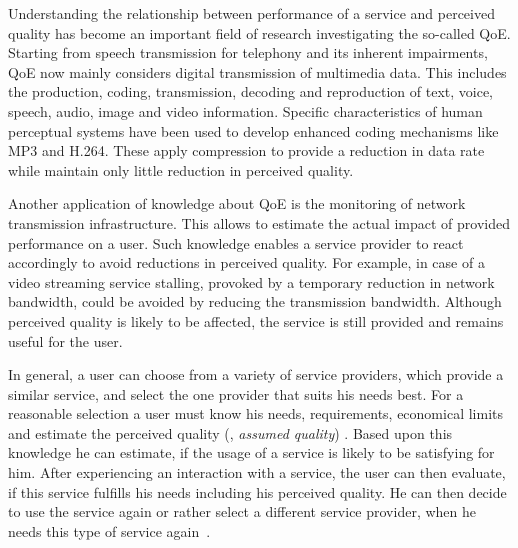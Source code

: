 Understanding the relationship between performance of a service and perceived quality has become an important field of research investigating the so-called \ac{QoE}.
Starting from speech transmission for telephony \citep[][]{ieee_audio_and_electroacoustics_group_ieee_1969} and its inherent impairments, \ac{QoE} now mainly considers digital transmission of multimedia data. %
This includes the production, coding, transmission, decoding and reproduction of text, voice, speech, audio, image and video information.
Specific characteristics of human perceptual systems have been used to develop enhanced coding mechanisms like \ac{MP3} and H.264.
These apply compression to provide a reduction in data rate while maintain only little reduction in perceived quality.

Another application of knowledge about \ac{QoE} is the monitoring of network transmission infrastructure.
This allows to estimate the actual impact of provided performance on a user.
Such knowledge enables a service provider to react accordingly to avoid reductions in perceived quality.
For example, in case of a video streaming service stalling, provoked by a temporary reduction in network bandwidth, could be avoided by reducing the transmission bandwidth.
Although perceived quality is likely to be affected, the service is still provided and remains useful for the user.

In general, a user can choose from a variety of service providers, which provide a similar service, and select the one provider that suits his needs best.
For a reasonable selection a user must know his needs, requirements, economical limits and estimate the perceived quality (\ie, \emph{assumed quality}) \citep[][p.~13]{raake_quality_2014}.
Based upon this knowledge he can estimate, if the usage of a service is likely to be satisfying for him.
After experiencing an interaction with a service, the user can then evaluate, if this service fulfills his needs including his perceived quality.
He can then decide to use the service again or rather select a different service provider, when he needs this type of service again~\citep[][]{geerts_linking_2010}.

